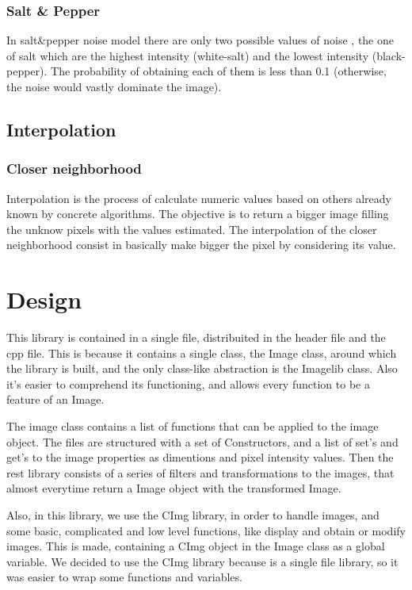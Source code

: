 \documentclass[a4paper]{article}
\begin{document}
\subsubsection{Salt \& Pepper}

In salt\&pepper noise model there are only two possible values of noise , the one of salt which are the highest intensity (white-salt) and the lowest intensity (black-pepper). The probability of obtaining each of them is less than 0.1 (otherwise, the noise would vastly dominate the image). 


\subsection{Interpolation}
\subsubsection{Closer neighborhood}

Interpolation is the process of calculate numeric values based on others already known by concrete algorithms. The objective is to return a bigger image filling the unknow pixels with the values estimated.
The interpolation of the closer neighborhood consist in basically make bigger the pixel by considering its value.


\section{Design}
	This library is contained in a single file, distribuited in the header file and the cpp file. This is because it contains a single class, the Image class, around which the library is built, and the only class-like abstraction is the Imagelib class. Also it's easier to comprehend its functioning, and allows every function to be a feature of an Image. 
    
    The image class contains a list of functions that can be applied to the image object. The files are structured with a set of Constructors, and a list of set's and get's to the image properties as dimentions and pixel intensity values. Then the rest library consists of a series of filters and transformations to the images, that almost everytime return a Image object with the transformed Image.
    
    Also, in this library, we use the CImg library, in order to handle images, and some basic, complicated and low level functions, like display and  obtain or modify images. This is made, containing a CImg object in the Image class as a global variable. We decided to use the CImg library because is a single file library, so it was easier to wrap some functions and variables. 
    
\end{document}
